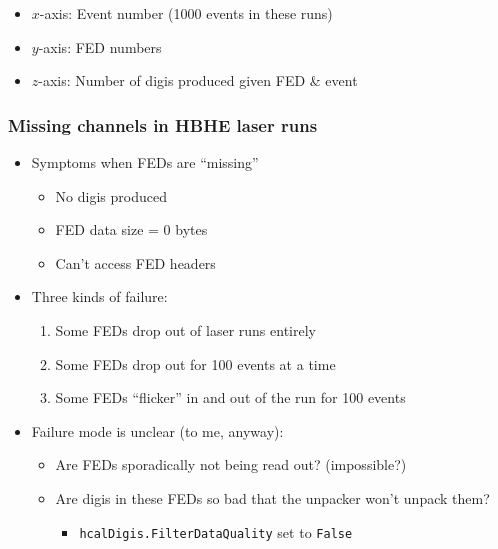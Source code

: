 \documentclass[bigger]{beamer}
\begin{document}
\begin{frame}
\begin{itemize}
\item $x$-axis: Event number (1000 events in these runs)
\label{sec-1-2-1-2}%

\item $y$-axis: FED numbers
\label{sec-1-2-1-3}%

\item $z$-axis: Number of digis produced given FED \& event
\label{sec-1-2-1-4}%
\end{itemize} %
\end{frame}
\begin{frame}
\frametitle{Missing channels in HBHE laser runs}
\label{sec-1-2-2}
\begin{itemize}

\item Symptoms when FEDs are ``missing''
\label{sec-1-2-2-1}%
\begin{itemize}

\item No digis produced
\label{sec-1-2-2-1-1}%

\item FED data size = 0 bytes
\label{sec-1-2-2-1-2}%

\item Can't access FED headers
\label{sec-1-2-2-1-3}%
\end{itemize} %

\item Three kinds of failure:
\label{sec-1-2-2-2}%
\begin{enumerate}
\item Some FEDs drop out of laser runs entirely
\item Some FEDs drop out for 100 events at a time
\item Some FEDs ``flicker'' in and out of the run for 100 events
\end{enumerate}

\item Failure mode is unclear (to me, anyway):
\label{sec-1-2-2-3}%
\begin{itemize}

\item Are FEDs sporadically not being read out? (impossible?)
\label{sec-1-2-2-3-1}%

\item Are digis in these FEDs so bad that the unpacker won't unpack them?
\label{sec-1-2-2-3-2}%
\begin{itemize}

\item \texttt{hcalDigis.FilterDataQuality} set to \texttt{False}
\label{sec-1-2-2-3-2-1}%
\end{itemize} %
\end{itemize} %
\end{itemize} %
\end{frame}
\end{document}
